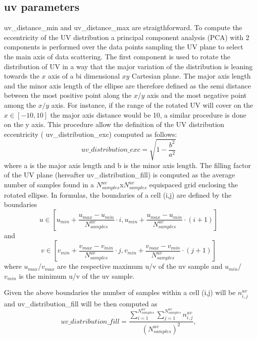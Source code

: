 \documentclass[11pt,a4paper]{ivoa}
\begin{document}
\subsection{uv parameters}
uv\_distance\_min and uv\_distance\_max are straigthforward.
To compute the eccentricity of the UV distribution a principal component analysis (PCA) with 2 components is performed over the data points sampling the UV plane to select the main axis of data scattering. The first component is used to rotate the distribution of UV in a way that the major variation of the distribution is leaning towards the $x$ axis of a bi dimensional $xy$ Cartesian plane. The major axis length and the minor axis length of the ellipse are therefore defined as the semi distance between the most positive point along the $x$/$y$ axis and the most negative point among the $x/y$ axis. For instance, if the range of the rotated UV will cover on the $x \in [-10, 10]$ the major axis distance would be 10, a similar procedure is done on the y axis. This procedure allow the definition of the UV distribution eccentricity (
uv\_distribution\_exc) computed as follows:
\begin{equation}
uv\_distribution\_exc = \sqrt{1-\frac{b^2}{a^2}}
\end{equation}
where a is the major axis length and b is the minor axis length.
The filling factor of the UV plane (hereafter uv\_distribution\_fill) is computed as the average number of samples found in a $N^{uv}_{samples}$x$N^{uv}_{samples}$ equispaced grid enclosing the rotated ellipse. In formulas,
 the boundaries of a cell (i,j) are defined by the boundaries
\begin{equation}
u \in [u_{min} + \frac{u_{max} - u_{min}}{N^{uv}_{samples}} \cdot i , u_{min} + \frac{u_{max} - u_{min}}{N^{uv}_{samples}} \cdot (i + 1)]
\end{equation} 
and
\begin{equation}
v \in [v_{min} + \frac{v_{max} - v_{min}}{N^{uv}_{samples}} \cdot j , v_{min} + \frac{v_{max} - v_{min}}{N^{uv}_{samples}} \cdot (j + 1)]
\end{equation} 
where $u_{max}$/$v_{max}$ are the respective maximum u/v of the uv sample and $u_{min}$/$v_{min}$ is the minimum u/v of the uv sample.

Given the above boundaries the number of samples within a cell (i,j) will be $n^{uv}_{i,j}$ and uv\_distribution\_fill will be then computed as 
\begin{equation}
uv\_distribution\_fill = \frac{\sum^{N^{uv}_{samples}}_{i=1} \sum^{N^{uv}_{samples}}_{j=1} n^{uv}_{i,j} }{(N^{uv}_{samples}) ^ 2},
\end{equation}
\end{document}
